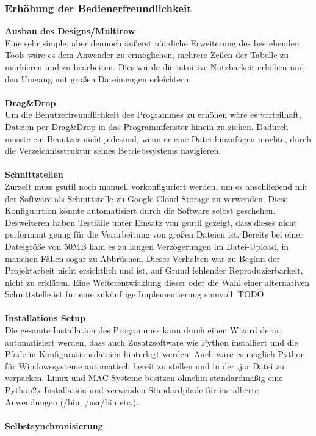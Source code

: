 \documentclass[13pt,a4paper,bibliography=totocnumbered,listof=totocnumbered]{scrartcl}
\begin{document}
\subsubsection{Erhöhung der Bedienerfreundlichkeit}
\textbf{Ausbau des Designs/Multirow}\\
Eine sehr simple, aber dennoch äußerst nützliche Erweiterung des bestehenden Tools wäre es dem Anwender zu ermöglichen, mehrere Zeilen der Tabelle zu markieren und zu bearbeiten. Dies würde die intuitive Nutzbarkeit erhöhen und den Umgang mit großen Dateimengen erleichtern. \\
\\\textbf{Drag\&Drop}\\
Um die Benutzerfreundlichkeit des Programmes zu erhöhen wäre es vorteilhaft, Dateien per Drag\&Drop in das Programmfenster hinein zu ziehen. Dadurch müsste ein Benutzer nicht jedesmal, wenn er eine Datei hinzufügen möchte, durch die Verzeichnisstruktur seines Betriebssystems navigieren.\\
\\\textbf{Schnittstellen}\\
Zurzeit muss gsutil noch manuell vorkonfiguriert werden, um es anschließend mit der Software als Schnittstelle zu Google Cloud Storage zu verwenden. Diese Konfiguartion könnte automatisiert durch die Software selbst geschehen. Desweiteren haben Testfälle unter Einsatz von gsutil gezeigt, dass dieses nicht performant genug für die Verarbeitung von großen Dateien ist. Bereits bei einer Dateigröße von 50MB kam es zu langen Verzögerungen im Datei-Upload, in manchen Fällen sogar zu Abbrüchen. Dieses Verhalten war zu Beginn der Projektarbeit nicht ersichtlich und ist, auf Grund fehlender Reproduzierbarkeit, nicht zu erklären. Eine Weiterentwicklung dieser oder die Wahl einer alternativen Schnittstelle ist für eine zukünftige Implementierung sinnvoll. TODO\\
\\\textbf{Installations Setup}\\
Die gesamte Installation des Programmes kann durch einen Wizard derart automatisiert werden, dass auch Zusatzsoftware wie Python installiert und die Pfade in Konfigurationsdateien hinterlegt werden. Auch wäre es möglich Python für Windowssysteme automatisch bereit zu stellen und in der .jar Datei zu verpacken. Linux und MAC Systeme besitzen ohnehin standardmäßig eine Python2x Installation und verwenden Standardpfade für installierte Anwendungen (/bin, /usr/bin etc.).\\
\\\textbf{Selbstsynchronisierung}\\
\end{document}
